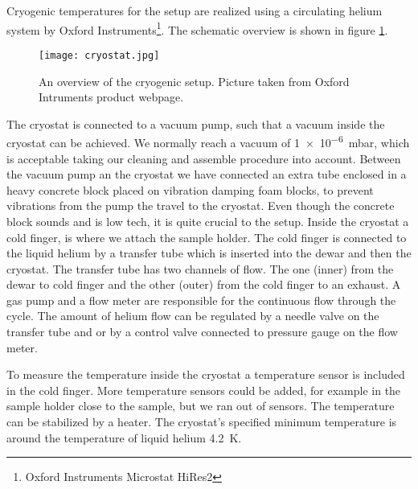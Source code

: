 Cryogenic temperatures for the setup are realized using a circulating helium system by Oxford Instruments\footnote{Oxford Instruments Microstat HiRes2}. The schematic overview is shown in figure \ref{fig:cryo_setup}.

\begin{figure}[H]
\centering
\texttt{[image: cryostat.jpg]}
\caption{An overview of the cryogenic setup. Picture taken from Oxford Intruments product webpage.}
\label{fig:cryo_setup}
\end{figure}

The cryostat is connected to a vacuum pump, such that a vacuum inside the cryostat can be achieved. We normally reach a vacuum of \SI{1e-6}{\milli\bar}, which is acceptable taking our cleaning and assemble procedure into account. Between the vacuum pump an the cryostat we have connected an extra tube enclosed in a heavy concrete block placed on vibration damping foam blocks, to prevent vibrations from the pump the travel to the cryostat. Even though the concrete block sounds and is low tech, it is quite crucial to the setup. Inside the cryostat a cold finger, is where we attach the sample holder. The cold finger is connected to the liquid helium by a transfer tube which is inserted into the dewar and then the cryostat. The transfer tube has two channels of flow. The one (inner) from the dewar to cold finger and the other (outer) from the cold finger to an exhaust. A gas pump and a flow meter are responsible for the continuous flow through the cycle. The amount of helium flow can be regulated by a needle valve on the transfer tube and or by a control valve connected to pressure gauge on the flow meter.

To measure the temperature inside the cryostat a temperature sensor is included in the cold finger. More temperature sensors could be added, for example in the sample holder close to the sample, but we ran out of sensors. The temperature can be stabilized by a heater. The cryostat's specified minimum temperature is around the temperature of liquid helium \SI{4.2}{\kelvin}.